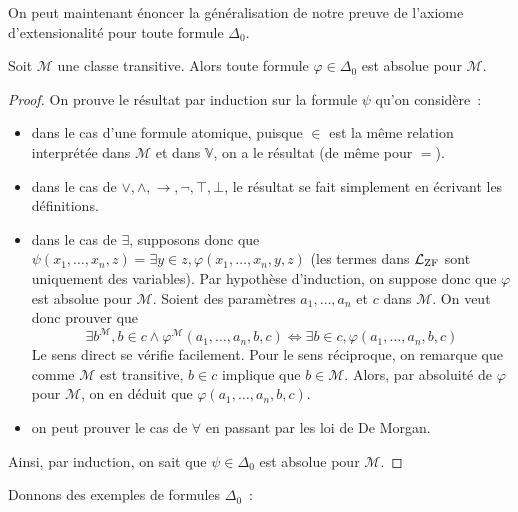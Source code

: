 On peut maintenant énoncer la généralisation de notre preuve de l'axiome
d'extensionalité pour toute formule $\Delta_0$.

\begin{proposition}
  Soit $\mathcal M$ une classe transitive. Alors toute formule
  $\varphi\in\Delta_0$ est absolue pour $\mathcal M$.
\end{proposition}

\begin{proof}
  On prouve le résultat par induction sur la formule $\psi$ qu'on considère~:
  \begin{itemize}
  \item dans le cas d'une formule atomique, puisque $\in$ est la même relation
    interprétée dans $\mathcal M$ et dans $\mathbb V$, on a le résultat (de
    même pour $=$).
  \item dans le cas de $\lor,\land,\to,\lnot,\top,\bot$, le résultat se fait
    simplement en écrivant les définitions.
  \item dans le cas de $\exists$, supposons donc que
    $\psi(x_1,\ldots,x_n,z) = \exists y \in z,\varphi(x_1,\ldots,x_n,y,z)$
    (les termes dans $\mathcal L_{\operatorname{ZF}}$ sont uniquement des variables). Par
    hypothèse d'induction, on suppose donc que $\varphi$ est absolue pour
    $\mathcal M$. Soient des paramètres $a_1,\ldots,a_n$ et $c$ dans
    $\mathcal M$. On veut donc prouver que
    \[\exists b^{\mathcal M}, b \in c \land \varphi^{\mathcal M}(a_1,\ldots,a_n,b,c)
    \iff \exists b \in c, \varphi(a_1,\ldots,a_n,b,c)\]
    Le sens direct se vérifie facilement. Pour le sens réciproque, on
    remarque que comme $\mathcal M$ est transitive, $b \in c$ implique que
    $b \in \mathcal M$. Alors, par absoluité de $\varphi$ pour $\mathcal M$,
    on en déduit que $\varphi(a_1,\ldots,a_n,b,c)$.
  \item on peut prouver le cas de $\forall$ en passant par les loi de De Morgan.
  \end{itemize}
  Ainsi, par induction, on sait que $\psi \in \Delta_0$ est absolue pour
  $\mathcal M$.
\end{proof}

Donnons des exemples de formules $\Delta_0$~:

